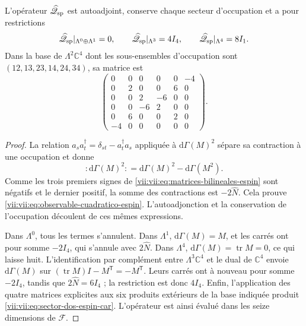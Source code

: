 \begin{proposition}
\label{vii:vii:prop:operador-espin-car}
L'opérateur \(\widehat{\mathscr Q}_{\rm sp}\) est autoadjoint,
conserve chaque secteur d'occupation et a pour restrictions
\begin{equation}
 \widehat{\mathscr Q}_{\rm sp}|_{\Lambda^0\oplus\Lambda^1}=0,
 \qquad
 \widehat{\mathscr Q}_{\rm sp}|_{\Lambda^3}=4I_4,
 \qquad
 \widehat{\mathscr Q}_{\rm sp}|_{\Lambda^4}=8I_1.
 \label{vii:vii:eq:sectores-espin-car}
\end{equation}
Dans la base de \(\Lambda^2\mathbb C^4\) dont les sous-ensembles d'occupation sont \((12,13,23,14,24,34)\), sa matrice est
\begin{equation}
 \begin{pmatrix}
 0&0&0&0&0&-4\\
 0&2&0&0&6&0\\
 0&0&2&-6&0&0\\
 0&0&-6&2&0&0\\
 0&6&0&0&2&0\\
 -4&0&0&0&0&0
 \end{pmatrix}.
 \label{vii:vii:eq:sector-dos-espin-car}
\end{equation}
\end{proposition}
\begin{proof}
La relation \(a_s a_t^\dagger=\delta_{st}-a_t^\dagger a_s\)
appliquée à \(\mathrm d\Gamma(M)^2\) sépare sa contraction à
une occupation et donne
\[
 :\!\mathrm d\Gamma(M)^2\!:
 =\mathrm d\Gamma(M)^2-\mathrm d\Gamma(M^2).
\]
Comme les trois premiers signes de
\eqref{vii:vii:eq:matrices-bilineales-espin} sont négatifs et le dernier
positif, la somme des contractions est \(-2\widehat N\).
Cela prouve \eqref{vii:vii:eq:observable-cuadratico-espin}.
L'autoadjonction et la conservation de l'occupation découlent de
ces mêmes expressions.

Dans \(\Lambda^0\), tous les termes s'annulent. Dans \(\Lambda^1\), \(\mathrm d\Gamma(M)=M\), et les carrés ont pour somme \(-2I_4\), qui s'annule avec \(2\widehat N\). Dans \(\Lambda^4\), \(\mathrm d\Gamma(M)=\operatorname{tr}M=0\), ce qui laisse huit. L'identification par complément entre \(\Lambda^3\mathbb C^4\) et le dual de \(\mathbb C^4\) envoie \(\mathrm d\Gamma(M)\) sur \((\operatorname{tr}M)I-M^{\mathsf T}=-M^{\mathsf T}\). Leurs carrés ont à nouveau pour somme \(-2I_4\), tandis que \(2\widehat N=6I_4\) ; la restriction est donc \(4I_4\). Enfin, l'application des quatre matrices explicites aux six produits extérieurs de la base indiquée produit \eqref{vii:vii:eq:sector-dos-espin-car}. L'opérateur est ainsi évalué dans les seize dimensions de \(\mathcal F\).
\end{proof}

